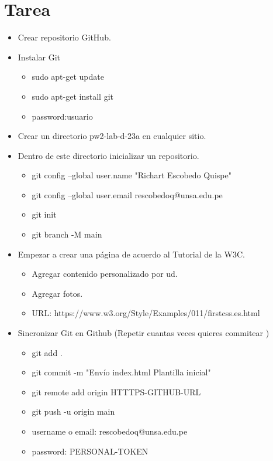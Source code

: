 \documentclass{article}
\begin{document}
	\section{Tarea}
	\begin{itemize}		
		\item Crear repositorio GitHub.
        \item Instalar Git
        \begin{itemize}
            \item sudo apt-get update
		      \item sudo apt-get install git
		      \item password:usuario
        \end{itemize}
\item Crear un directorio pw2-lab-d-23a en cualquier sitio.
\item Dentro de este directorio inicializar un repositorio.
\begin{itemize}
    \item git config --global user.name "Richart Escobedo Quispe"
	\item git config --global user.email rescobedoq@unsa.edu.pe
	\item git init
	\item git branch -M main
\end{itemize}
\item Empezar a crear una página de acuerdo al Tutorial de la W3C.
\begin{itemize}
    \item Agregar contenido personalizado por ud.
	\item Agregar fotos.
    \item URL: https://www.w3.org/Style/Examples/011/firstcss.es.html 
\end{itemize}

\item Sincronizar Git en Github (Repetir cuantas veces quieres commitear	)
		\begin{itemize}
		    \item git add .
            \item git commit -m "Envío index.html Plantilla inicial"
		      \item git remote add origin HTTTPS-GITHUB-URL
		      \item git push -u origin main
		      \item username o email: rescobedoq@unsa.edu.pe
		      \item password: PERSONAL-TOKEN
		\end{itemize}
	\end{itemize}
		
\end{document}
